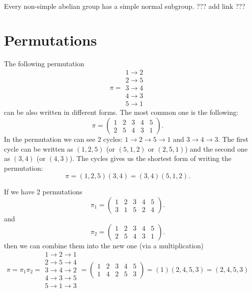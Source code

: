 \begin{appendices}
\begin{theorem}
  Every non-simple abelian group has a simple normal subgroup.
  ??? add link ???
  \label{thm:simple_subgroup_of_abelian}
\end{theorem}
  
\section{Permutations}

\begin{example}[Permutation]
  The following permutation
  \[ \pi = 
  \begin{array}{c}
    1 \to 2 \\
    2 \to 5 \\
    3 \to 4 \\
    4 \to 3 \\
    5 \to 1 
  \end{array}
  \]
  can be also written in different forms. The most common one is the following:
  \[
  \pi = \begin{pmatrix}
    1 & 2 & 3 & 4 & 5 \\
    2 & 5 & 4 & 3 & 1
  \end{pmatrix}.
  \]
  In the permutation we can see 2 cycles:
  $1 \to 2 \to 5 \to 1$ and $3 \to 4 \to 3$. The first cycle can be
  written as $(1,2,5)$ (or $(5,1,2)$ or $(2,5,1)$) and the second
  one as $(3,4)$ (or $(4,3)$). The cycles gives us the shortest form
  of writing the permutation:
  \[
  \pi = (1,2,5)(3,4) = (3,4)(5,1,2).
  \]
  
  If we have 2 permutations
  \[
  \pi_1 = \begin{pmatrix}
    1 & 2 & 3 & 4 & 5 \\
    3 & 1 & 5 & 2 & 4
  \end{pmatrix}.
  \]
  and
  \[
  \pi_2 = \begin{pmatrix}
    1 & 2 & 3 & 4 & 5 \\
    2 & 5 & 4 & 3 & 1
  \end{pmatrix}.
  \]
  then we can combine them into the new one (via a multiplication)
  \[ \pi = \pi_1 \pi_2 = 
  \begin{array}{c}
    1 \to 2 \to 1 \\
    2 \to 5 \to 4\\
    3 \to 4 \to 2\\
    4 \to 3 \to 5\\
    5 \to 1 \to 3 
  \end{array} =
  \begin{pmatrix}
    1 & 2 & 3 & 4 & 5 \\
    1 & 4 & 2 & 5 & 3
  \end{pmatrix} = (1)(2,4,5,3) = (2,4,5,3)
  \]


\end{example}
\end{appendices}
